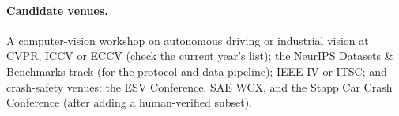 \documentclass[10pt,twocolumn]{article}
\begin{document}
\paragraph{Candidate venues.} A computer-vision workshop on autonomous driving or industrial
vision at CVPR, ICCV or ECCV (check the current year's list); the NeurIPS Datasets \&
Benchmarks track (for the protocol and data pipeline); IEEE IV or ITSC; and crash-safety venues:
the ESV Conference, SAE WCX, and the Stapp Car Crash Conference (after adding a human-verified
subset).

{\small}
\end{document}
